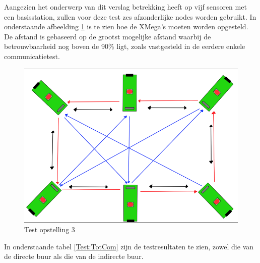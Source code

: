 Aangezien het onderwerp van dit verslag betrekking heeft op vijf sensoren met een basisstation, zullen voor deze test zes afzonderlijke nodes worden gebruikt. In onderstaande afbeelding \ref{fig:TestTotCom} is te zien hoe de XMega's moeten worden opgesteld. De afstand is gebaseerd op de grootst mogelijke afstand waarbij de betrouwbaarheid nog boven de 90\% ligt, zoals vastgesteld in de eerdere enkele communicatietest.

\begin{figure}[h]
    \centering
    \includegraphics[scale = 0.3]{img/Screenshot_294.png}
    \caption{Test opstelling 3}
    \label{fig:TestTotCom}
\end{figure}
In onderstaande tabel \ref{Test:TotCom} zijn de testresultaten te zien, zowel die van de directe buur als die van de indirecte buur.
